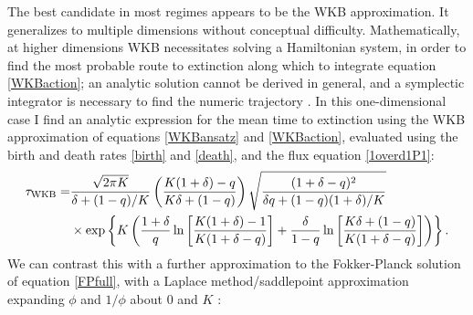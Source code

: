The best candidate in most regimes appears to be the WKB approximation. 
It generalizes to multiple dimensions without conceptual difficulty.
Mathematically, at higher dimensions WKB necessitates solving a Hamiltonian system, in order to find the most probable route to extinction along which to integrate equation \ref{WKBaction}; an analytic solution cannot be derived in general, and a symplectic integrator is necessary to find the numeric trajectory \cite{Channell1990}. 
In this one-dimensional case I find an analytic expression for the mean time to extinction using the WKB approximation of equations \ref{WKBansatz} and \ref{WKBaction}, evaluated using the birth and death rates \ref{birth} and \ref{death}, and the flux equation \ref{1overd1P1}:
\begin{align}
\tau_{\text{WKB}} = &\frac{\sqrt{2 \pi K}}{\delta+(1-q)/K} \left(\frac{K(1+\delta)-q}{K\delta + (1-q)}\right) \sqrt{\frac{(1+\delta-q)^2}{\delta q + (1-q)(1+\delta)/K}} \\
					&\times \exp \left\{ K\left( \frac{1+\delta}{q}\ln\left[\frac{K(1+\delta)-1}{K(1+\delta-q)}\right] + \frac{\delta}{1-q}\ln\left[\frac{K\delta+(1-q)}{K(1+\delta-q)}\right] \right) \right\}. \notag
\end{align}
We can contrast this with a further approximation to the Fokker-Planck solution of equation \ref{FPfull}, with a Laplace method/saddlepoint approximation expanding $\phi$ and $1/\phi$ about $0$ and $K$ \cite{Nisbet1982,Grasman1996,Doering2005}:
